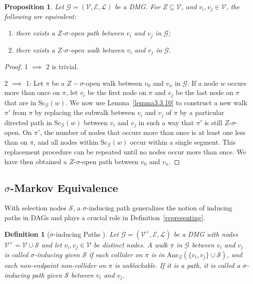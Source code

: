 \documentclass[accepted]{uai2025} %
\newtheorem{definition}{Definition}
\newtheorem{proposition}{Proposition}
\newcommand{\anc}{\text{Anc}}
\begin{document}
\begin{proposition} \label{proposition3.3.6}
Let $\mathcal{G}=(\mathcal{V},\mathcal{E},\mathcal{L})$ be a DMG. For $Z\subseteq \mathcal{V}$, and $v_i,v_j\in\mathcal{V}$, the following are equivalent:
\begin{enumerate}
    \item there exists a $Z$-$\sigma$-open path between $v_i$ and $v_j$ in $\mathcal{G}$;
    \item there exists a $Z$-$\sigma$-open walk between $v_i$ and $v_j$ in $\mathcal{G}$.
\end{enumerate}
\end{proposition}
\begin{proof}
1 $\implies$ 2 is trivial.

2 $\implies$ 1: Let $\pi$ be a $Z-\sigma$-open walk between $v_0$ and $v_n$ in $\mathcal{G}$. If a node $w$ occurs more than once on $\pi$, let $v_i$ be the first node on $\pi$ and $v_j$ be the last node on $\pi$ that are in $\text{Sc}_\mathcal{G}(w)$. We now use Lemma~\ref{lemma3.3.10} to construct a new walk $\pi'$ from $\pi$ by replacing the subwalk between $v_i$ and $v_j$ of $\pi$ by a particular directed path in $\text{Sc}_\mathcal{G}(w)$ between $v_i$ and $v_j$ in such a way that $\pi'$ is still $Z$-$\sigma$-open. On $\pi'$, the number of nodes that occurs more than once is at least one less than on $\pi$, and all nodes within $\text{Sc}_\mathcal{G}(w)$ occur within a single segment. This replacement procedure can be repeated until no nodes occur more than once. We have then obtained a $Z$-$\sigma$-open path between $v_0$ and $v_n$. 
\end{proof}







\subsection{\texorpdfstring{$\sigma$-Markov Equivalence}{sigma-Markov Equivalence}}
With selection nodes $\mathcal{S}$, a $\sigma$-inducing path generalizes the notion of inducing paths in DAGs and plays a crucial role in Definition~\ref{representing}.

\begin{definition} [$\sigma$-inducing Paths \citep{mooij2020constraint}] \label{sigmaSeparation}
Let \( \mathcal{G} = (\mathcal{V}^+,\mathcal{E},\mathcal{L}) \) be a DMG with nodes $\mathcal{V}^+=\mathcal{V}\cup\mathcal{S}$ and let $v_i,v_j\in\mathcal{V}$ be distinct nodes. A walk $\pi$ in $\mathcal{G}$ between $v_i$ and $v_j$ is called \emph{$\sigma$-inducing given $\mathcal{S}$} if each collider on $\pi$ is in $\anc_\mathcal{G}(\{v_i,v_j\}\cup\mathcal{S})$, and each non-endpoint non-collider on $\pi$ is unblockable. If it is a path, it is called a \emph{$\sigma$-inducing path given $\mathcal{S}$} between $v_i$ and $v_j$. 
\end{definition}
\end{document}
